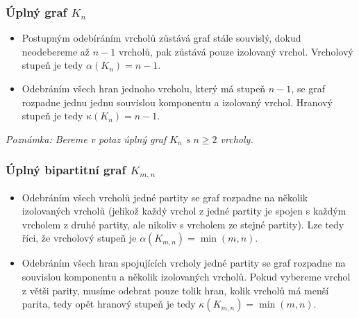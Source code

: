 \documentclass[10pt, a4paper]{ReportSheet}
\begin{document}
\begin{uloha}{8}{2}
        \subsubsection{Úplný graf $K_n$}
        \begin{itemize}
            \item Postupným odebíráním vrcholů zůstává graf stále souvislý, dokud neodebereme až $n-1$ vrcholů, pak zůstává pouze izolovaný vrchol. Vrcholový stupeň je tedy $\alpha(K_n) = n-1$.
            \item Odebráním všech hran jednoho vrcholu, který má stupeň $n-1$, se graf rozpadne jednu jednu souvislou
            komponentu a izolovaný vrchol. Hranový stupeň je tedy $\kappa(K_n) = n-1$.
        \end{itemize}
        \textit{Poznámka: Bereme v potaz úplný graf $K_n$ s $n \geq 2$ vrcholy.}

        \subsubsection{Úplný bipartitní graf $K_{m,n}$}
        \begin{itemize}
            \item Odebráním všech vrcholů jedné partity se graf rozpadne na několik izolovaných vrcholů (jelikož každý
            vrchol z jedné partity je spojen s každým vrcholem z druhé partity, ale nikoliv s vrcholem ze stejné partity). Lze tedy říci, že vrcholový stupeň je $\alpha(K_{m,n}) = \min(m, n)$.
            \item Odebráním všech hran spojujících vrcholy jedné partity se graf rozpadne na souvislou komponentu a
            několik izolovaných vrcholů. Pokud vybereme vrchol z větši parity, musíme odebrat pouze tolik hran, kolik
            vrcholů má menší parita, tedy opět hranový stupeň je tedy $\kappa(K_{m,
            n}) = \min(m, n)$.
        \end{itemize}

    \end{uloha}
\end{document}
